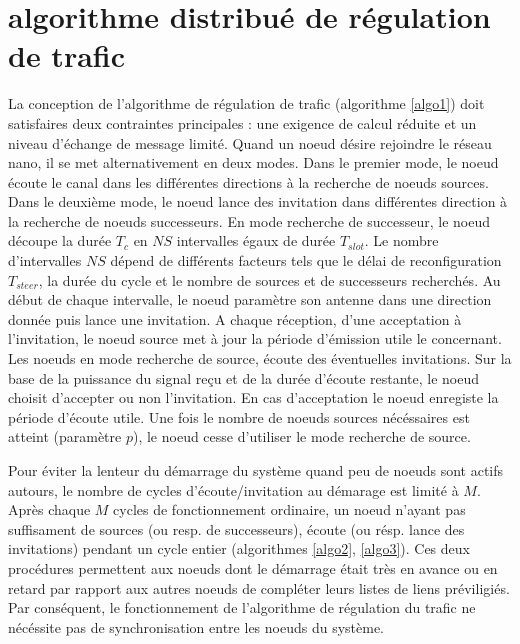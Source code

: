 \documentclass[sigconf]{acmart}
\begin{document}
\section{algorithme distribué de régulation de trafic}
La conception de l'algorithme de régulation de trafic (algorithme \ref{algo1}) doit satisfaires deux contraintes principales : une exigence de calcul réduite et un niveau d'échange de message limité. Quand un noeud désire rejoindre le réseau nano, il se met alternativement en deux modes. Dans le premier mode, le noeud écoute le canal dans les différentes directions à la recherche de noeuds sources. Dans le deuxième mode, le noeud lance des invitation dans différentes direction à la recherche de noeuds successeurs. En mode recherche de successeur, le noeud découpe la durée $T_{c}$ en $NS$ intervalles égaux de durée $T_{slot}$. Le nombre d'intervalles $NS$ dépend de différents facteurs tels que le délai de reconfiguration $T_{steer}$, la durée du cycle et le nombre de sources et de successeurs recherchés. Au début de chaque intervalle, le noeud paramètre son antenne dans une direction donnée puis lance une invitation. A chaque réception, d'une acceptation à l'invitation, le noeud source met à jour la période d'émission utile le concernant. Les noeuds en mode recherche de source, écoute des éventuelles invitations. Sur la base de la puissance du signal reçu et de la durée d'écoute restante, le noeud choisit d'accepter ou non l'invitation. En cas d'acceptation le noeud enregiste la période d'écoute utile. Une fois le nombre de noeuds sources nécéssaires est atteint (paramètre $p$), le noeud cesse d'utiliser le mode recherche de source. 

Pour éviter la lenteur du démarrage du système quand peu de noeuds sont actifs autours, le nombre de cycles d'écoute/invitation au démarage est limité à $M$. Après chaque $M$ cycles de fonctionnement ordinaire, un noeud n'ayant pas suffisament de sources (ou resp. de successeurs), écoute (ou résp. lance des invitations) pendant un cycle entier (algorithmes \ref{algo2}, \ref{algo3}). Ces deux procédures permettent aux noeuds dont le démarrage était très en avance ou en retard par rapport aux autres noeuds de compléter leurs listes de liens préviligiés. Par conséquent, le fonctionnement de l'algorithme de régulation du trafic ne nécéssite pas de synchronisation entre les noeuds du système.
\end{document}
